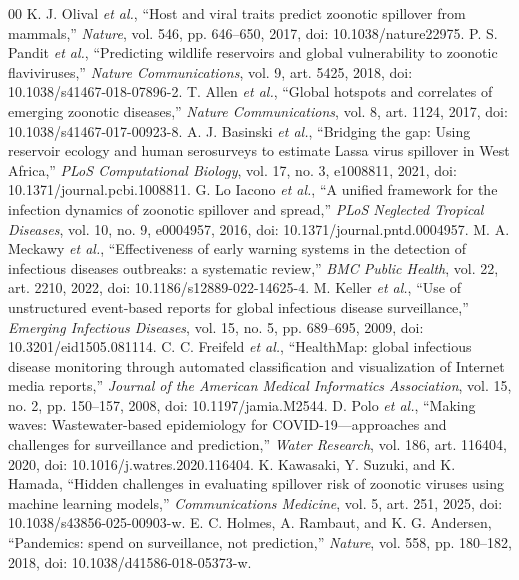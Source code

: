 \documentclass[conference]{IEEEtran}
\begin{document}
\begin{thebibliography}{00}
 K. J. Olival \emph{et al.}, ``Host and viral traits predict zoonotic spillover from mammals,'' \emph{Nature}, vol. 546, pp. 646--650, 2017, doi: 10.1038/nature22975.
 P. S. Pandit \emph{et al.}, ``Predicting wildlife reservoirs and global vulnerability to zoonotic flaviviruses,'' \emph{Nature Communications}, vol. 9, art. 5425, 2018, doi: 10.1038/s41467-018-07896-2.
 T. Allen \emph{et al.}, ``Global hotspots and correlates of emerging zoonotic diseases,'' \emph{Nature Communications}, vol. 8, art. 1124, 2017, doi: 10.1038/s41467-017-00923-8.
 A. J. Basinski \emph{et al.}, ``Bridging the gap: Using reservoir ecology and human serosurveys to estimate Lassa virus spillover in West Africa,'' \emph{PLoS Computational Biology}, vol. 17, no. 3, e1008811, 2021, doi: 10.1371/journal.pcbi.1008811.
 G. Lo Iacono \emph{et al.}, ``A unified framework for the infection dynamics of zoonotic spillover and spread,'' \emph{PLoS Neglected Tropical Diseases}, vol. 10, no. 9, e0004957, 2016, doi: 10.1371/journal.pntd.0004957.
 M. A. Meckawy \emph{et al.}, ``Effectiveness of early warning systems in the detection of infectious diseases outbreaks: a systematic review,'' \emph{BMC Public Health}, vol. 22, art. 2210, 2022, doi: 10.1186/s12889-022-14625-4.
 M. Keller \emph{et al.}, ``Use of unstructured event-based reports for global infectious disease surveillance,'' \emph{Emerging Infectious Diseases}, vol. 15, no. 5, pp. 689--695, 2009, doi: 10.3201/eid1505.081114.
 C. C. Freifeld \emph{et al.}, ``HealthMap: global infectious disease monitoring through automated classification and visualization of Internet media reports,'' \emph{Journal of the American Medical Informatics Association}, vol. 15, no. 2, pp. 150--157, 2008, doi: 10.1197/jamia.M2544.
 D. Polo \emph{et al.}, ``Making waves: Wastewater-based epidemiology for COVID-19---approaches and challenges for surveillance and prediction,'' \emph{Water Research}, vol. 186, art. 116404, 2020, doi: 10.1016/j.watres.2020.116404.
 K. Kawasaki, Y. Suzuki, and K. Hamada, ``Hidden challenges in evaluating spillover risk of zoonotic viruses using machine learning models,'' \emph{Communications Medicine}, vol. 5, art. 251, 2025, doi: 10.1038/s43856-025-00903-w.
 E. C. Holmes, A. Rambaut, and K. G. Andersen, ``Pandemics: spend on surveillance, not prediction,'' \emph{Nature}, vol. 558, pp. 180--182, 2018, doi: 10.1038/d41586-018-05373-w.
\end{thebibliography}
\end{document}
